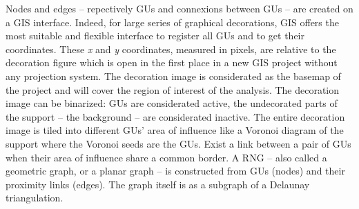 \documentclass[article]{jss}\usepackage{knitr}
\begin{document}
Nodes and edges -- repectively GUs and connexions between GUs -- are created on a GIS interface. Indeed, for large series of graphical decorations, GIS offers the most suitable and flexible interface to register all GUs and to get their coordinates. These \emph{x} and \emph{y} coordinates, measured in pixels, are relative to the decoration figure which is open in the first place in a new GIS project without any projection system. The decoration image is considerated as the basemap of the project and will cover the region of interest of the analysis. The decoration image can be binarized: GUs are considerated active, the undecorated parts of the support -- the background -- are considerated inactive. The entire decoration image is tiled into different GUs' area of influence like a Voronoi diagram of the support where the Voronoi seeds are the GUs. Exist a link between a pair of GUs when their area of influence share a common border. A RNG -- also called a geometric graph, or a planar graph -- is constructed from GUs (nodes) and their proximity links (edges). The graph itself is as a subgraph of a Delaunay triangulation.
\end{document}
